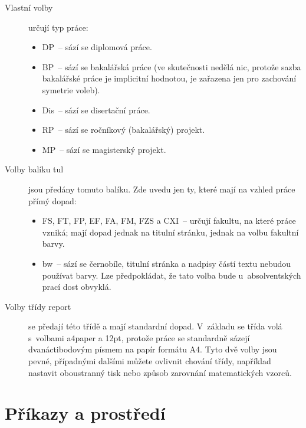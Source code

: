 \documentclass[FM,DP]{tulthesis}
\newcommand{\argument}[1]{{\ttfamily\color{\tulcolor}#1}}
\begin{document}
\begin{description}
\item[Vlastní volby] určují typ práce:

\begin{itemize}
\item \argument{DP}~-- sází se diplomová práce.
\item \argument{BP}~-- sází se bakalářská práce (ve skutečnosti nedělá nic,
protože sazba bakalářské práce je implicitní hodnotou, je zařazena jen pro
zachování symetrie voleb).
\item \argument{Dis}~-- sází se disertační práce.
\item \argument{RP}~-- sází se ročníkový (bakalářský) projekt.
\item \argument{MP}~-- sází se magisterský projekt.
\end{itemize}

\item[Volby balíku \argument{tul}] jsou předány tomuto balíku. Zde uvedu jen
ty, které mají na vzhled práce přímý dopad:

\begin{itemize}
\item \argument{FS},
\argument{FT},
\argument{FP},
\argument{EF},
\argument{FA},
\argument{FM},
\argument{FZS} a
\argument{CXI}~-- určují fakultu, na které práce vzniká; mají dopad jednak na
titulní stránku, jednak na volbu fakultní barvy.

\item \argument{bw}~-- sází se černobíle, titulní stránka a nadpisy částí textu
nebudou používat barvy. Lze předpokládat, že tato volba bude u~absolventských
prací dost obvyklá.
\end{itemize}

\item[Volby třídy \argument{report}] se předají této třídě a mají
standardní dopad. V~základu se třída volá s~volbami \argument{a4paper} a
\argument{12pt}, protože práce se standardně sázejí dvanáctibodovým písmem na
papír formátu A4. Tyto dvě volby jsou pevné, případnými dalšími můžete ovlivnit
chování třídy, například nastavit oboustranný tisk nebo způsob zarovnání
matematických vzorců.

\end{description}


\chapter{Příkazy a prostředí}
\end{document}
